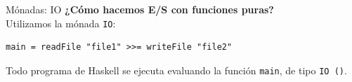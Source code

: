 \begin{frame}[fragile]{Mónadas: IO}
\textbf{¿Cómo hacemos E/S con funciones puras?}\\
Utilizamos la mónada \texttt{IO}:

\espacio

\begin{lstlisting}
main = readFile "file1" >>= writeFile "file2"
\end{lstlisting}

\espacio

Todo programa de Haskell se ejecuta evaluando la función \texttt{main}, de tipo
\texttt{IO ()}.

\end{frame}
